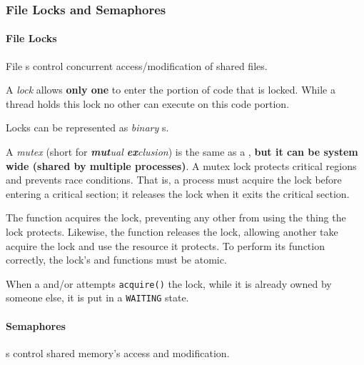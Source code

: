 \subsubsection{File Locks and Semaphores}\label{subsubsec:IPC_Mechanism-File_Locks_Semaphores}
\paragraph{File Locks}\label{par:File_Locks}
File s control concurrent access/modification of shared files.
\begin{definition}[Lock]\label{def:Lock}
  A \emph{lock} allows \textbf{only one}  to enter the portion of code that is locked.
  While a thread holds this lock no other  can execute on this code portion.

  \begin{remark}\label{rmk:Binary_Semaphore}
    Locks can be represented as \emph{binary }s.
  \end{remark}
\end{definition}

\begin{definition}[Mutex]\label{def:Mutex}
  A \emph{mutex} (short for \emph{\textbf{mut}ual \textbf{ex}clusion}) is the same as a , \textbf{but it can be system wide (shared by multiple processes)}.
  A mutex lock protects critical regions and prevents race conditions.
  That is, a process must acquire the lock before entering a critical section; it releases the lock when it exits the critical section.

  The  function acquires the lock, preventing any other  from using the thing the lock protects.
  Likewise, the  function releases the lock, allowing another  take acquire the lock and use the resource it protects.
  To perform its function correctly, the lock's  and  functions must be atomic.

  When a  and/or  attempts \texttt{acquire()} the lock, while it is already owned by someone else, it is put in a \texttt{WAITING} state.
\end{definition}

\paragraph{Semaphores}\label{par:Semaphores}
s control shared memory's access and modification.

